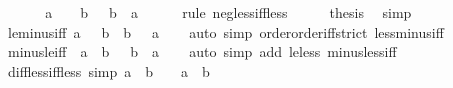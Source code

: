 \begin{isabellebody}
%
\isadelimproof
%
\endisadelimproof
%
\isatagproof
{}\isamarkupfalse%
\ {\isacharminus}{\kern0pt}\isanewline
\ \ \isamarkupfalse%
\ {\isachardoublequoteopen}{\isacharminus}{\kern0pt}\ a\ {\isacharless}{\kern0pt}\ {\isacharminus}{\kern0pt}\ {\isacharparenleft}{\kern0pt}{\isacharminus}{\kern0pt}\ b{\isacharparenright}{\kern0pt}\ {\isasymlongleftrightarrow}\ {\isacharminus}{\kern0pt}\ b\ {\isacharless}{\kern0pt}\ a{\isachardoublequoteclose}\isanewline
\ \ \ \ \isamarkupfalse%
\ {\isacharparenleft}{\kern0pt}rule\ neg{\isacharunderscore}{\kern0pt}less{\isacharunderscore}{\kern0pt}iff{\isacharunderscore}{\kern0pt}less{\isacharparenright}{\kern0pt}\isanewline
\ \ \isamarkupfalse%
\ \isamarkupfalse%
\ {\isacharquery}{\kern0pt}thesis\ \isamarkupfalse%
\ simp\isanewline
{}\isamarkupfalse%
%
\endisatagproof
{\isafoldproof}%
%
\isadelimproof
\isanewline
%
\endisadelimproof
\isanewline
{}\isamarkupfalse%
\ le{\isacharunderscore}{\kern0pt}minus{\isacharunderscore}{\kern0pt}iff{\isacharcolon}{\kern0pt}\ {\isachardoublequoteopen}a\ {\isasymle}\ {\isacharminus}{\kern0pt}\ b\ {\isasymlongleftrightarrow}\ b\ {\isasymle}\ {\isacharminus}{\kern0pt}\ a{\isachardoublequoteclose}\isanewline
%
\isadelimproof
\ \ %
\endisadelimproof
%
\isatagproof
{}\isamarkupfalse%
\ {\isacharparenleft}{\kern0pt}auto\ simp{\isacharcolon}{\kern0pt}\ order{\isachardot}{\kern0pt}order{\isacharunderscore}{\kern0pt}iff{\isacharunderscore}{\kern0pt}strict\ less{\isacharunderscore}{\kern0pt}minus{\isacharunderscore}{\kern0pt}iff{\isacharparenright}{\kern0pt}%
\endisatagproof
{\isafoldproof}%
%
\isadelimproof
\isanewline
%
\endisadelimproof
\isanewline
{}\isamarkupfalse%
\ minus{\isacharunderscore}{\kern0pt}le{\isacharunderscore}{\kern0pt}iff{\isacharcolon}{\kern0pt}\ {\isachardoublequoteopen}{\isacharminus}{\kern0pt}\ a\ {\isasymle}\ b\ {\isasymlongleftrightarrow}\ {\isacharminus}{\kern0pt}\ b\ {\isasymle}\ a{\isachardoublequoteclose}\isanewline
%
\isadelimproof
\ \ %
\endisadelimproof
%
\isatagproof
{}\isamarkupfalse%
\ {\isacharparenleft}{\kern0pt}auto\ simp\ add{\isacharcolon}{\kern0pt}\ le{\isacharunderscore}{\kern0pt}less\ minus{\isacharunderscore}{\kern0pt}less{\isacharunderscore}{\kern0pt}iff{\isacharparenright}{\kern0pt}%
\endisatagproof
{\isafoldproof}%
%
\isadelimproof
\isanewline
%
\endisadelimproof
\isanewline
{}\isamarkupfalse%
\ diff{\isacharunderscore}{\kern0pt}less{\isacharunderscore}{\kern0pt}{}{\isacharunderscore}{\kern0pt}iff{\isacharunderscore}{\kern0pt}less\ {\isacharbrackleft}{\kern0pt}simp{\isacharbrackright}{\kern0pt}{\isacharcolon}{\kern0pt}\ {\isachardoublequoteopen}a\ {\isacharminus}{\kern0pt}\ b\ {\isacharless}{\kern0pt}\ {}\ {\isasymlongleftrightarrow}\ a\ {\isacharless}{\kern0pt}\ b{\isachardoublequoteclose}\isanewline

\end{isabellebody}
